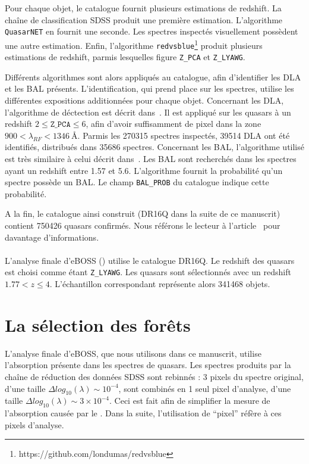 \documentclass[11pt, twoside, a4paper, openright]{report}
\begin{document}
Pour chaque objet, le catalogue fournit plusieurs estimations de redshift. La chaîne de classification SDSS produit une première estimation. L'algorithme \texttt{QuasarNET} en fournit une seconde. Les spectres inspectés visuellement possèdent une autre estimation. Enfin, l'algorithme \texttt{redvsblue}\footnote{https://github.com/londumas/redvsblue} produit plusieurs estimations de redshift, parmis lesquelles figure \texttt{Z\_PCA} et \texttt{Z\_LYAWG}.

Différents algorithmes sont alors appliqués au catalogue, afin d'identifier les DLA et les BAL présents. L'identification, qui prend place sur les spectres, utilise les différentes expositions additionnées pour chaque objet.
Concernant les DLA, l'algorithme de déctection est décrit dans~\cite{Parks2017}. Il est appliqué sur les quasars à un redshift $2 \leq \texttt{Z\_PCA} \leq 6$, afin d'avoir suffisamment de pixel dans la zone $900 < \lambda_{RF} < \SI{1346}{\angstrom}$. Parmis les \num{270315} spectres inspectés, \num{39514} DLA ont été identifiés, distribués dans \num{35686} spectres.
Concernant les BAL, l'algorithme utilisé est très similaire à celui décrit dans~\cite{Guo2019}. Les BAL sont recherchés dans les spectres ayant un redshift entre \num{1.57} et \num{5.6}. L'algorithme fournit la probabilité qu'un spectre possède un BAL. Le champ \texttt{BAL\_PROB} du catalogue indique cette probabilité.

A la fin, le catalogue ainsi construit (DR16Q dans la suite de ce manuscrit) contient \num{750426} quasars confirmés. Nous référons le lecteur à l'article~\cite{CITE:Lyke in prep} pour davantage d'informations.



\paragraph{}
L'analyse \lya{} finale d'eBOSS (\cite{CITE:dr16}) utilise le catalogue DR16Q. Le redshift des quasars est choisi comme étant \texttt{Z\_LYAWG}. Les quasars sont sélectionnés avec un redshift $1.77 < z \leq 4$. L'échantillon correspondant représente alors \num{341468} objets.


\section{La sélection des forêts}
L'analyse \lya{} finale d'eBOSS, que nous utilisons dans ce manuscrit, utilise l'absorption \lya{} présente dans les spectres de quasars. Les spectres produits par la chaîne de réduction des données SDSS sont rebinnés : 3 pixels du spectre original, d'une taille $\Delta log_{10}(\lambda) \sim 10^{-4}$, sont combinés en 1 seul pixel d'analyse, d'une taille $\Delta log_{10}(\lambda) \sim 3 \times 10^{-4}$. Ceci est fait afin de simplifier la mesure de l'absorption causée par le \lya{}. Dans la suite, l'utilisation de ``pixel'' réfère à ces pixels d'analyse.
\end{document}
